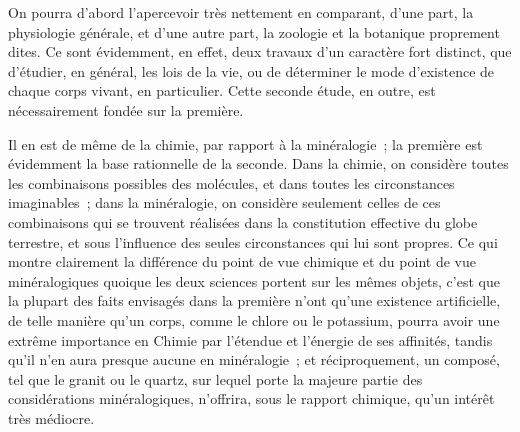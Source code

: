 \documentclass[french,twoside]{book} %
\begin{document}
On pourra d’abord l’apercevoir très nettement en comparant, d’une part, la physiologie générale, et d’une autre part, la zoologie et la botanique proprement dites. Ce sont évidemment, en effet, deux travaux d’un caractère fort distinct, que d’étudier, en général, les lois de la vie, ou de déterminer le mode d’existence de chaque corps vivant, en particulier. Cette seconde étude, en outre, est nécessairement fondée sur la première.\par
Il en est de même de la chimie, par rapport à la minéralogie ; la première est évidemment la base rationnelle de la seconde. Dans la chimie, on considère toutes les combinaisons possibles des molécules, et dans toutes les circonstances imaginables ; dans la minéralogie, on considère seulement celles de ces combinaisons qui se trouvent réalisées dans la constitution effective du globe terrestre, et sous l’influence des seules circonstances qui lui sont propres. Ce qui montre clairement la différence du point de vue chimique et du point de vue minéralogiques quoique les deux sciences portent sur les mêmes objets, c’est que la plupart des faits envisagés dans la première n’ont qu’une existence artificielle, de telle manière qu’un corps, comme le chlore ou le potassium, pourra avoir une extrême importance en Chimie par l’étendue et l’énergie de ses affinités, tandis qu’il n’en aura presque aucune en minéralogie ; et réciproquement, un composé, tel que le granit ou le quartz, sur lequel porte la majeure partie des considérations minéralogiques, n’offrira, sous le rapport chimique, qu’un intérêt très médiocre.\par
\end{document}
